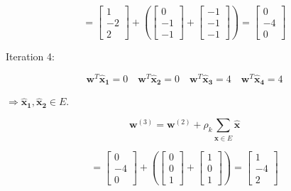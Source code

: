 \documentclass[fleqn]{article}
\begin{document}
\begin{enumerate}
		\begin{equation*}
			= \begin{bmatrix} 1 \\ -2 \\ 2 \end{bmatrix}			 + \left(\begin{bmatrix}0\\-1\\-1\end{bmatrix} + \begin{bmatrix}-1\\-1\\-1\end{bmatrix}\right) = \begin{bmatrix}0\\-4\\0\end{bmatrix}
		\end{equation*}
		
		Iteration 4:
		
		\begin{equation*}
			\mathbf{w}^T\mathbf{\hat{x}_1} = 0 \quad \mathbf{w}^T\mathbf{\hat{x}_2} = 0 \quad \mathbf{w}^T\mathbf{\hat{x}_3} = 4 \quad \mathbf{w}^T\mathbf{\hat{x}_4} = 4
		\end{equation*}
		
		$\Rightarrow \mathbf{\hat{x}_1}, \mathbf{\hat{x}_2} \in E$.
		
		\begin{equation*}
			\mathbf{w}^{(3)} = \mathbf{w}^{(2)} + \rho_k\sum_{\mathbf{\hat{x}} \in E}{\mathbf{\hat{x}}}
		\end{equation*}
			
		\begin{equation*}
			= \begin{bmatrix} 0 \\ -4 \\ 0 \end{bmatrix}			 + \left(\begin{bmatrix}0\\0\\1\end{bmatrix} + \begin{bmatrix}1\\0\\1\end{bmatrix}\right) = \begin{bmatrix}1\\-4\\2\end{bmatrix}
		\end{equation*}
		

\end{enumerate}
\end{document}
